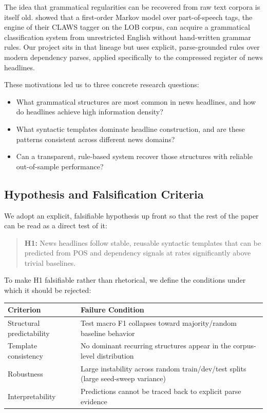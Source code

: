 \documentclass[11pt]{article}
\begin{document}
The idea that grammatical regularities can be recovered from raw text corpora is itself old. \citet{atwell-drakos-1987-pattern} showed that a first-order Markov model over part-of-speech tags, the engine of their CLAWS tagger on the LOB corpus, can acquire a grammatical classification system from unrestricted English without hand-written grammar rules. Our project sits in that lineage but uses explicit, parse-grounded rules over modern dependency parses, applied specifically to the compressed register of news headlines.

These motivations led us to three concrete research questions:
\begin{itemize}
    \item What grammatical structures are most common in news headlines, and how do headlines achieve high information density?
    \item What syntactic templates dominate headline construction, and are these patterns consistent across different news domains?
    \item Can a transparent, rule-based system recover those structures with reliable out-of-sample performance?
\end{itemize}

\subsection{Hypothesis and Falsification Criteria}
\label{sec:hypothesis}
We adopt an explicit, falsifiable hypothesis up front so that the rest of the paper can be read as a direct test of it:

\begin{quote}
\textbf{H1:} News headlines follow stable, reusable syntactic templates that can be predicted from POS and dependency signals at rates significantly above trivial baselines.
\end{quote}

To make H1 falsifiable rather than rhetorical, we define the conditions under which it should be rejected:

\begin{table}[h]
\centering
\small
\begin{tabular}{p{}p{}}
\toprule
\textbf{Criterion} & \textbf{Failure Condition} \\
\midrule
Structural predictability & Test macro F1 collapses toward majority/random baseline behavior \\
Template consistency & No dominant recurring structures appear in the corpus-level distribution \\
Robustness & Large instability across random train/dev/test splits (large seed-sweep variance) \\
Interpretability & Predictions cannot be traced back to explicit parse evidence \\
\bottomrule
\end{tabular}
\end{table}
\end{document}
